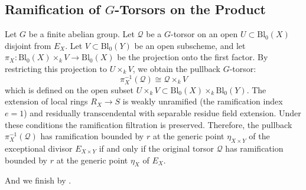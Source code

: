 \subsection*{Ramification of $G$-Torsors on the Product}
Let $G$ be a finite abelian group.
Let $\mathcal{Q}$ be a $G$-torsor on an open $U \subset \text{Bl}_0(X)$ disjoint from $E_X$.
Let $V \subset \text{Bl}_0(Y)$ be an open subscheme, and let $\pi_X: \text{Bl}_0(X) \times_k V \to \text{Bl}_0(X)$
be the projection onto the first factor.
By restricting this projection to $U \times_k V$, we obtain the pullback $G$-torsor:
$$\pi_X^{-1}(\mathcal{Q}) \cong \mathcal{Q} \times_k V$$
which is defined on the open subset $U \times_k V \subset \text{Bl}_0(X) \times_k \text{Bl}_0(Y)$.
The extension of local rings $R_X \to S$ is weakly unramified (the ramification index $e=1$) and residually transcendental with separable residue field extension.
Under these conditions the ramification filtration is preserved.
Therefore, the pullback $\pi_X^{-1}(\mathcal{Q})$ has ramification bounded by $r$ at the generic point $\eta_{X \times Y}$ of the exceptional divisor $E_{X \times Y}$ if and only if
the original torsor $\mathcal{Q}$ has ramification bounded by $r$ at the generic point $\eta_X$ of $E_X$.

And we finish by .
